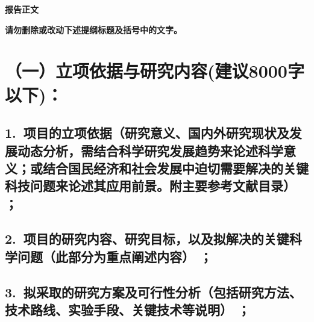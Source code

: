 \documentclass[12pt,UTF8,AutoFakeBold=2.5,a4paper]{ctexart} %
\newcommand{\sanhao}{\fontsize{16pt}{\baselineskip}\selectfont}
\newcommand{\sihao}{\fontsize{14pt}{\baselineskip}\selectfont}
\begin{document}

\begin{center}
{\sanhao \kaishu \bfseries \hspace{1.5em}  报告正文}
\end{center}

{\sihao \kaishu \bfseries \color{MsBlue} \hspace{0.2em} \hspace{-0.55em}  请勿删除或改动下述提纲标题及括号中的文字。}

\vskip -7mm

\section{{ \hspace{-1.35em} \bfseries（一）立项依据与研究内容}(建议8000字以下)：} %

\vskip 2mm

\subsection{\hspace{1.45em} 1.~{\bfseries 项目的立项依据}（研究意义、国内外研究现状及发展动态分析，需结合科学研究发展趋势来论述科学意义；或结合国民经济和社会发展中迫切需要解决的关键科技问题来论述其应用前景。附主要参考文献目录）\hspace{-14pt} ；}






\subsection{\hspace{1.45em} 2.~{\bfseries 项目的研究内容、研究目标，以及拟解决的关键科学问题}（此部分为重点阐述内容）\hspace{-14pt} {\bfseries ；}}



\subsection{\hspace{1.45em}  3.~{\bfseries 拟采取的研究方案及可行性分析}（包括研究方法、技术路线、实验手段、关键技术等说明）\hspace{-14pt} ；}
\end{document}
